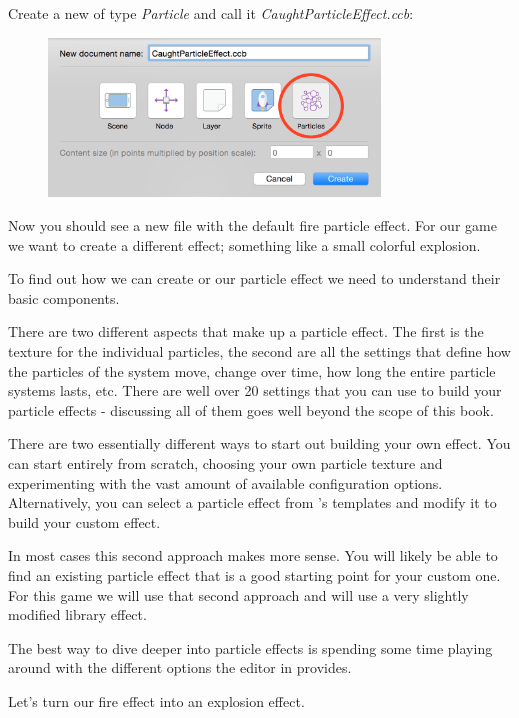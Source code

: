 \begin{leftbar}
Create a new \ccbfile{} of type \textit{Particle} and call it
\textit{CaughtParticleEffect.ccb}:
\begin{figure}[H]
  \centering
  \includegraphics[width=250pt]{images/Chapter9/create_particle_effect.png}
\end{figure}
\end{leftbar}

Now you should see a new file with the default fire particle effect. For our
game we want to create a different effect; something like a small colorful
explosion.

To find out how we can create or our particle effect we need to understand their
basic components.

There are two different
aspects that make up a particle effect. The first is the texture for the
individual particles, the second are all the settings that define how the
particles of the system move, change over time, how long the entire particle
systems lasts, etc. There are well over 20 settings that you can use to build
your particle effects - discussing all of them goes well beyond the scope of
this book.

There are two essentially different ways to start out building your own effect.
You can start entirely from scratch, choosing your own particle texture and
experimenting with the vast amount of available configuration options.
Alternatively, you can select a particle effect from \SB{}'s templates and
modify it to build your custom effect.

In most cases this second approach makes more sense. You will likely be able to
find an existing particle effect that is a good starting point for your
custom one. For this game we will use that second approach and will use a very
slightly modified library effect.

The best way to dive deeper into particle effects is spending some time playing
around with the different options the editor in \SB{} provides.

Let's turn our fire effect into an explosion effect.

